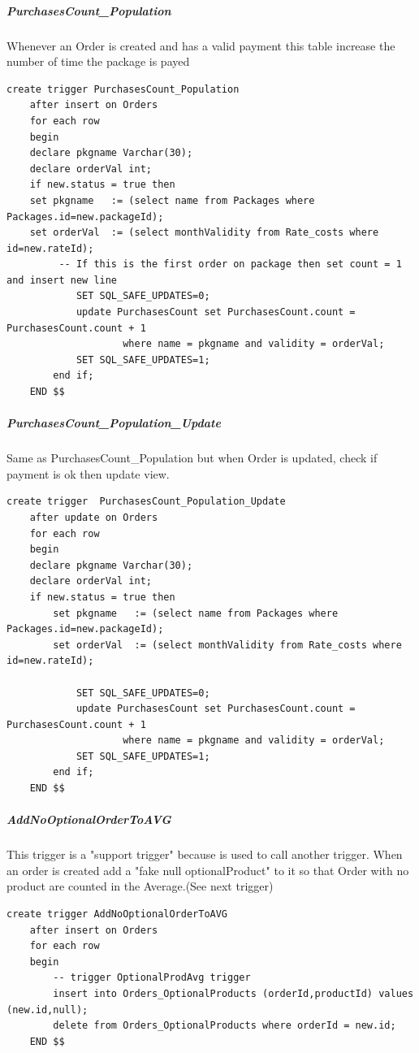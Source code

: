\documentclass{article}
\begin{document}
\subparagraph{PurchasesCount_Population}
Whenever an Order is created and has a valid payment this table increase the number of time the package is payed
\begin{lstlisting}
create trigger PurchasesCount_Population
	after insert on Orders 
    for each row
	begin
	declare pkgname Varchar(30);
    declare orderVal int;
    if new.status = true then
    set pkgname   := (select name from Packages where Packages.id=new.packageId);
    set orderVal  := (select monthValidity from Rate_costs where id=new.rateId);
		 -- If this is the first order on package then set count = 1 and insert new line
            SET SQL_SAFE_UPDATES=0;
			update PurchasesCount set PurchasesCount.count = PurchasesCount.count + 1
					where name = pkgname and validity = orderVal;
            SET SQL_SAFE_UPDATES=1;
        end if;
	END $$
\end{lstlisting}

\subparagraph{PurchasesCount_Population_Update}
Same as PurchasesCount_Population but when Order is updated, check if payment is ok then update view.
\begin{lstlisting}
create trigger  PurchasesCount_Population_Update
    after update on Orders
    for each row
	begin
	declare pkgname Varchar(30);
    declare orderVal int;
    if new.status = true then
		set pkgname   := (select name from Packages where Packages.id=new.packageId);
		set orderVal  := (select monthValidity from Rate_costs where id=new.rateId);

            SET SQL_SAFE_UPDATES=0;
			update PurchasesCount set PurchasesCount.count = PurchasesCount.count + 1
					where name = pkgname and validity = orderVal;
            SET SQL_SAFE_UPDATES=1;
        end if;
    END $$
\end{lstlisting}

\subparagraph{AddNoOptionalOrderToAVG}
This trigger is a "support trigger" because is used to call another trigger.
When an order is created add a "fake null optionalProduct" to it so that Order with no product are counted in the Average.(See next trigger)
\begin{lstlisting}
create trigger AddNoOptionalOrderToAVG
	after insert on Orders
    for each row
    begin
		-- trigger OptionalProdAvg trigger
		insert into Orders_OptionalProducts (orderId,productId) values (new.id,null);
		delete from Orders_OptionalProducts where orderId = new.id;
    END $$
\end{lstlisting}
\end{document}
